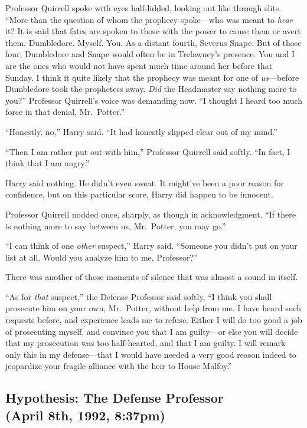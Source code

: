 Professor Quirrell spoke with eyes half-lidded, looking out like through slits. “More than the question of whom the prophecy spoke—who was meant to \emph{hear} it? It is said that fates are spoken to those with the power to cause them or avert them. Dumbledore. Myself. You. As a distant fourth, Severus Snape. But of those four, Dumbledore and Snape would often be in Trelawney’s presence. You and I are the ones who would not have spent much time around her before that Sunday. I think it quite likely that the prophecy was meant for one of \emph{us}—before Dumbledore took the prophetess away. \emph{Did} the Headmaster say nothing more to you?” Professor Quirrell’s voice was demanding now. “I thought I heard too much force in that denial, Mr.~Potter.”

“Honestly, no,” Harry said. “It had honestly slipped clear out of my mind.”

“Then I am rather put out with him,” Professor Quirrell said softly. “In fact, I think that I am angry.”

Harry said nothing. He didn’t even sweat. It might’ve been a poor reason for confidence, but on this particular score, Harry did happen to be innocent.

Professor Quirrell nodded once, sharply, as though in acknowledgment. “If there is nothing more to say between us, Mr.~Potter, you may go.”

“I can think of one \emph{other} suspect,” Harry said. “Someone you didn’t put on your list at all. Would you analyze him to me, Professor?”

There was another of those moments of silence that was almost a sound in itself.

“As for \emph{that} suspect,” the Defense Professor said softly, “I think you shall prosecute him on your own, Mr.~Potter, without help from me. I have heard such requests before, and experience leads me to refuse. Either I will do too good a job of prosecuting myself, and convince you that I am guilty—or else you will decide that my prosecution was too half-hearted, and that I am guilty. I will remark only this in my defense—that I would have needed a very good reason indeed to jeopardize your fragile alliance with the heir to House Malfoy.”
\sbreak

\subsection{Hypothesis: The Defense Professor\\(April 8th, 1992, 8:37pm)}
\sbreak

